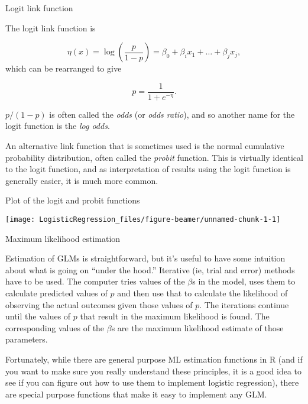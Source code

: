 \documentclass[10pt,ignorenonframetext,]{beamer}
\begin{document}
\begin{frame}{Logit link function}

The logit link function is

\[
\eta(x) = \log \left( \frac{p}{1-p} \right) = \beta_0 + \beta_i x_1 + \dots + \beta_j x_j,
\] which can be rearranged to give

\[
 p = \frac{1}{1 + e^{-\eta}}.
 \]

\(p/(1-p)\) is often called the \emph{odds} (or \emph{odds ratio}), and
so another name for the logit function is the \emph{log odds}.

An alternative link function that is sometimes used is the normal
cumulative probability distribution, often called the \emph{probit}
function. This is virtually identical to the logit function, and as
interpretation of results using the logit function is generally easier,
it is much more common.

\end{frame}

\begin{frame}{Plot of the logit and probit functions}

\begin{center}\texttt{[image: LogisticRegression\_files/figure-beamer/unnamed-chunk-1-1]} \end{center}

\end{frame}

\begin{frame}{Maximum likelihood estimation}

Estimation of GLMs is straightforward, but it's useful to have some
intuition about what is going on ``under the hood.'' Iterative (ie,
trial and error) methods have to be used. The computer tries values of
the \(\beta\)s in the model, uses them to calculate predicted values of
\(p\) and then use that to calculate the likelihood of observing the
actual outcomes given those values of \(p\). The iterations continue
until the values of \(p\) that result in the maximum likelihood is
found. The corresponding values of the \(\beta\)s are the maximum
likelihood estimate of those parameters.

Fortunately, while there are general purpose ML estimation functions in
R (and if you want to make sure you really understand these principles,
it is a good idea to see if you can figure out how to use them to
implement logistic regression), there are special purpose functions that
make it easy to implement any GLM.

\end{frame}
\end{document}
